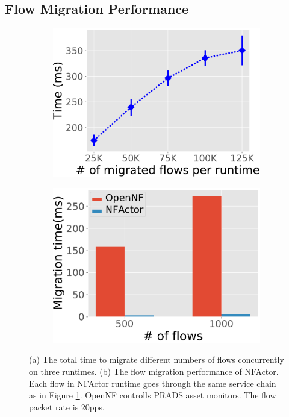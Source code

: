 \subsection{Flow Migration Performance}
\label{sec:fmp}

 \begin{figure}[!t]
	\begin{subfigure}[t]{0.49\linewidth}
		\centering
		\includegraphics[width=\columnwidth]{figure/Migration.pdf}
		\caption{}\label{fig:tot-mig} \end{subfigure}\hfill
	 \begin{subfigure}[t]{0.49\linewidth}
		\centering
		\includegraphics[width=\columnwidth]{figure/Compare.pdf}
		\caption{}\label{fig:compare-opennf}
	 \end{subfigure}
\caption{ (a) The total time to migrate different numbers of flows concurrently on three runtimes. (b) The flow migration performance of NFActor. Each flow in NFActor runtime goes through the same service chain as in Figure \ref{fig:tot-mig}. OpenNF controlls PRADS asset monitors. The flow packet rate is 20pps.}
\label{fig:mig-perf}
\end{figure}

